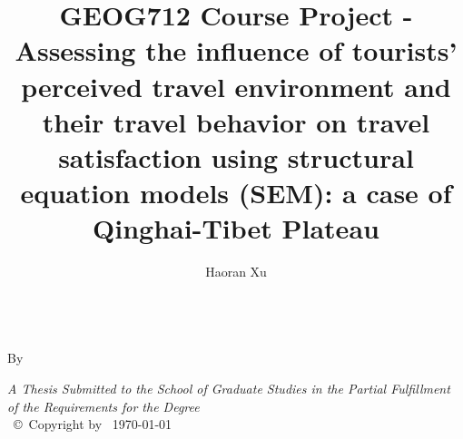 \documentclass[
11pt, %
oneside, %
english, %
singlespacing, %
]{macthesis} %
\title{GEOG712 Course Project - Assessing the influence of tourists' perceived travel environment and their travel behavior on travel satisfaction using structural equation models (SEM): a case of Qinghai-Tibet Plateau}
\author{Haoran Xu}
\date{}
\def\blankpage{%
      \clearpage%
      \thispagestyle{empty}%
      \addtocounter{page}{-1}%
      \null%
      \clearpage}
\begin{document}
\sloppy

\frontmatter %

\pagestyle{plain} %

\vspace{6cm}
\begin{center}
\ttitle
\end{center}
\clearpage

\begin{center}

\vfill
\textsc{\Large \ttitle} \\

\vfill
{By \authorname\, \bdeg }


 \vfill
{\large \textit{A Thesis Submitted to the School of Graduate Studies in the Partial Fulfillment of the Requirements for the Degree \degreename}}\\

\vfill
{\large \univname\, \copyright\, Copyright by \authorname\, \today}\\[4cm] %

\end{center}
\blankpage
\clearpage


\vspace*{0.2\textheight}

\bigbreak
\end{document}
